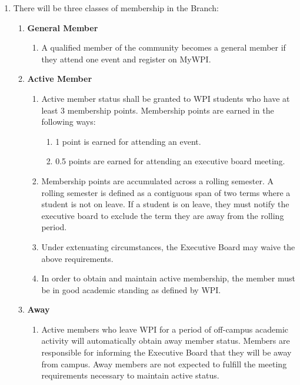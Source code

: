 \documentclass[11pt]{article}
\begin{document}
\begin{enumerate}
    \item There will be three classes of membership in the Branch:
    \begin{enumerate}[label=\Roman*.]
        \item \textbf{General Member}
        \begin{enumerate}
            \item A qualified member of the community becomes a general member if they attend one event and register on MyWPI.
        \end{enumerate}

        \item \textbf{Active Member}
        \begin{enumerate}
            \item Active member status shall be granted to WPI students who have at least 3 membership points. Membership points are earned in the following ways:
            \begin{enumerate}
                \item 1 point is earned for attending an event.
                \item 0.5 points are earned for attending an executive board meeting.
            \end{enumerate}
            \item Membership points are accumulated across a rolling semester. A rolling semester is defined as a contiguous span of two terms where a student is not on leave. If a student is on leave, they must notify the executive board to exclude the term they are away from the rolling period.
            \item Under extenuating circumstances, the Executive Board may waive the above requirements.
            \item In order to obtain and maintain active membership, the member must be in good academic standing as defined by WPI.
        \end{enumerate}

        \item \textbf{Away}
        \begin{enumerate}
            \item Active members who leave WPI for a period of off-campus academic activity will automatically obtain away member status. Members are responsible for informing the Executive Board that they will be away from campus. Away members are not expected to fulfill the meeting requirements necessary to maintain active status.
        \end{enumerate}


\end{enumerate}
\end{enumerate}
\end{document}
